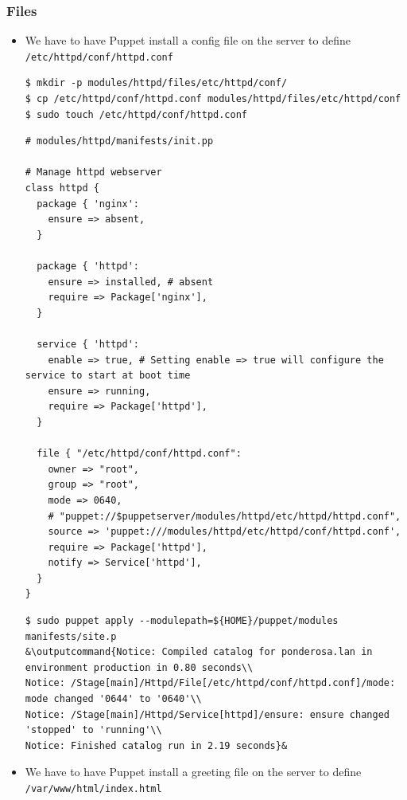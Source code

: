 \documentclass{beamer}
\newcommand{\outputcommand}[1]{\color{darkgreen}{#1}}
\begin{document}
\begin{frame}
\frametitle{Files}
\begin{itemize}
\item We have to have Puppet install a config file on the server to define \texttt{/etc/httpd/conf/httpd.conf}
\lstset{language=shell}
\begin{lstlisting}[escapechar=&]
$ mkdir -p modules/httpd/files/etc/httpd/conf/
$ cp /etc/httpd/conf/httpd.conf modules/httpd/files/etc/httpd/conf
$ sudo touch /etc/httpd/conf/httpd.conf
\end{lstlisting}

\lstset{language=shell}
\begin{lstlisting}[escapechar=&]
# modules/httpd/manifests/init.pp

# Manage httpd webserver
class httpd {
  package { 'nginx':
    ensure => absent,
  }

  package { 'httpd':
    ensure => installed, # absent
    require => Package['nginx'],
  }

  service { 'httpd':
    enable => true, # Setting enable => true will configure the service to start at boot time
    ensure => running,
    require => Package['httpd'],
  }

  file { "/etc/httpd/conf/httpd.conf":
    owner => "root",
    group => "root",
    mode => 0640,
    # "puppet://$puppetserver/modules/httpd/etc/httpd/httpd.conf",
    source => 'puppet:///modules/httpd/etc/httpd/conf/httpd.conf',
    require => Package['httpd'],
    notify => Service['httpd'],
  }
}
\end{lstlisting}

\begin{lstlisting}[escapechar=&]
$ sudo puppet apply --modulepath=${HOME}/puppet/modules manifests/site.p
&\outputcommand{Notice: Compiled catalog for ponderosa.lan in environment production in 0.80 seconds\\
Notice: /Stage[main]/Httpd/File[/etc/httpd/conf/httpd.conf]/mode: mode changed '0644' to '0640'\\
Notice: /Stage[main]/Httpd/Service[httpd]/ensure: ensure changed 'stopped' to 'running'\\
Notice: Finished catalog run in 2.19 seconds}&
\end{lstlisting}

\item  We have to have Puppet install a greeting file on the server to define \texttt{/var/www/html/index.html}


\end{itemize}
\end{frame}
\end{document}
